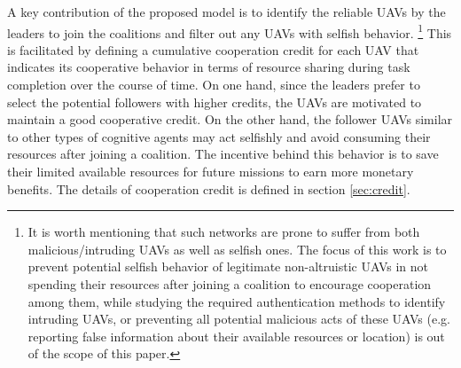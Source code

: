 \documentclass[conference]{IEEEtran}
\theoremstyle{remark}
\theoremstyle{lemma}
\begin{document}
A key contribution of the proposed model is to identify the reliable UAVs by the leaders to join the coalitions and filter out any UAVs with selfish behavior. \footnote{It is worth mentioning that such networks are prone to suffer from both malicious/intruding UAVs as well as selfish ones. The focus of this work is to prevent potential selfish behavior of legitimate non-altruistic UAVs in not spending their resources after joining a coalition to encourage cooperation among them, while studying the required authentication methods to identify intruding UAVs, or preventing all potential malicious acts of these UAVs (e.g. reporting false information about their available resources or location) is out of the scope of this paper. } This is facilitated by defining a cumulative cooperation credit for each UAV that indicates its cooperative behavior in terms of resource sharing during task completion over the course of time. On one hand, since the leaders prefer to select the potential followers with higher credits, the UAVs are motivated to maintain a good cooperative credit. On the other hand, the follower UAVs similar to other types of cognitive agents may act selfishly and avoid consuming their resources after joining a coalition. The incentive behind this behavior is to save their limited available resources for future missions to earn more  monetary benefits. The details of cooperation credit is defined in section \ref{sec:credit}.
\end{document}
